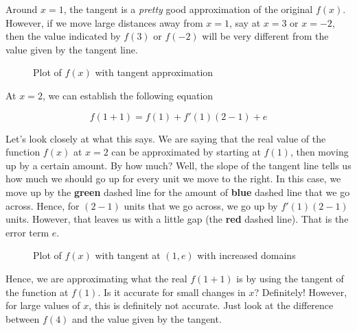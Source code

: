 \documentclass[11pt]{scrartcl}
\begin{document}
Around $x = 1$, the tangent is a \emph{pretty} good approximation of the original $f(x)$. However, if we move large distances away from $x=1$, say at $x=3$ or $x=-2$, then the value indicated by $f(3)$ or $f(-2)$ will be very different from the value given by the tangent line. 

\begin{figure}[ht!]
\centering
{}
\caption{Plot of $f(x)$ with tangent approximation}
\end{figure}

At $x=2$, we can establish the following equation

\[f(1+1) = f(1) + f \prime (1)(2-1) + e \]

Let's look closely at what this says. We are saying that the real value of the function $f(x)$ at $x=2$ can be approximated by starting at $f(1)$, then moving up by a certain amount. By how much? Well, the slope of the tangent line tells us how much we should go up for every unit we move to the right. In this case, we move up by the \textbf{green} dashed line for the amount of \textbf{blue} dashed line that we go across. Hence, for $(2-1)$ units that we go across, we go up by $f \prime (1)(2-1)$ units. However, that leaves us with a little gap (the \textbf{red} dashed line). That is the error term $e$.

\begin{figure}[ht!]
\centering
{}
\caption{Plot of $f(x)$ with tangent at $(1, e)$ with increased domains}
\end{figure}

Hence, we are approximating what the real $f(1+1)$ is by using the tangent of the function at $f(1)$. Is it accurate for small changes in $x$? Definitely! However, for large values of $x$, this is definitely not accurate. Just look at the difference between $f(4)$ and the value given by the tangent.
\end{document}
